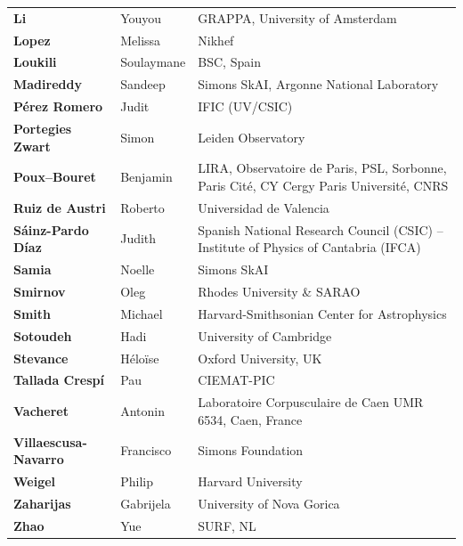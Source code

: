 \documentclass[9pt,a5paper,twoside]{extarticle}
\begin{document}
{\begin{tabularx}{\linewidth}{@{\hspace{1mm}}>{\bfseries\color{DeepBlue}}l l >{\raggedright\arraybackslash}X@{\hspace{1mm}}}
  Li & Youyou & GRAPPA, University of Amsterdam\\
  Lopez & Melissa & Nikhef\\
  Loukili & Soulaymane & BSC, Spain\\
  Madireddy & Sandeep & Simons SkAI, Argonne National Laboratory\\
  Pérez Romero & Judit & IFIC (UV/CSIC)\\
  Portegies Zwart & Simon & Leiden Observatory\\
  Poux--Bouret & Benjamin & LIRA, Observatoire de Paris, PSL, Sorbonne, Paris Cité, CY Cergy Paris Université, CNRS\\
  Ruiz de Austri & Roberto & Universidad de Valencia\\
  Sáinz-Pardo Díaz & Judith & Spanish National Research Council (CSIC) -- Institute of Physics of Cantabria (IFCA)\\
  Samia & Noelle & Simons SkAI\\
  Smirnov & Oleg & Rhodes University \& SARAO\\
  Smith & Michael & Harvard-Smithsonian Center for Astrophysics\\
  Sotoudeh & Hadi & University of Cambridge\\
  Stevance & Héloïse & Oxford University, UK\\
  Tallada Crespí & Pau & CIEMAT-PIC\\
  Vacheret & Antonin & Laboratoire Corpusculaire de Caen UMR 6534, Caen, France\\
  Villaescusa-Navarro & Francisco & Simons Foundation\\
  Weigel & Philip & Harvard University\\
  Zaharijas & Gabrijela & University of Nova Gorica\\
  Zhao & Yue & SURF, NL\\
\end{tabularx}
}
\end{document}
